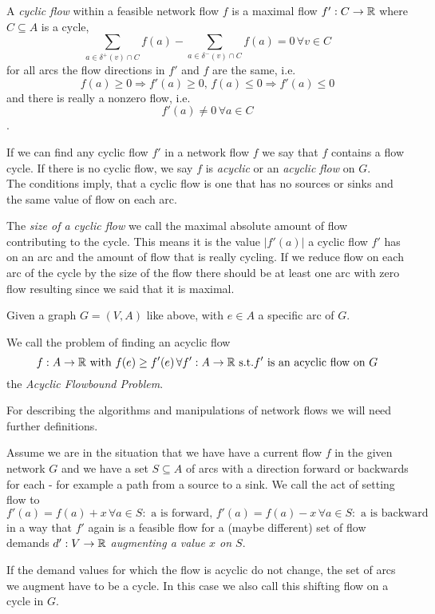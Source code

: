 \begin{definition}
A \textit{cyclic flow} within a feasible network flow $f$ is a maximal flow $f':C\to \mathbb{R}$ where $C\subseteq A$ is a 
cycle, $$\sum_{a\in \delta^+(v)\cap C}f(a)-\sum_{a\in\delta^-(v)\cap C}f(a) = 0 \, \forall v\in C$$ for all arcs the 
flow directions in $f'$ and $f$ are the same, i.e. $$f(a)\ge 0\Rightarrow f'(a)\ge 0,\, f(a)\le 0 \Rightarrow f'(a)\le 
0$$ and there is really a nonzero flow, i.e. $$f'(a) \ne 0 \,\forall a\in C$$. 

If we can find any cyclic flow $f'$ in a network flow $f$ we say that $f$ contains a flow cycle. If there is no cyclic 
flow, we say $f$ is \textit{acyclic} or an \textit{acyclic flow} on $G$.\\

The conditions imply, that a cyclic flow is one that has no sources or sinks and the same value of flow on each arc.

The \textit{size of a cyclic flow} we call the maximal absolute amount of flow contributing to the cycle. This means 
it is the value $|f'(a)|$ a cyclic flow $f'$ has on an arc and the amount of flow that is really cycling. If we reduce 
flow on each arc of the cycle by the size of the flow there should be at least one arc with zero flow resulting since 
we said that it is maximal.
\end{definition}


\begin{definition}
  Given a graph $G=(V,A)$ like above, with $e \in A$ a specific arc of $G$. 
  
  We call the problem of finding an acyclic flow 
  $$f:A\to \mathbb{R}\textrm{ with }f(e)\ge f'(e)\,\forall f':A\to \mathbb{R} \textrm{ s.t.} f' \textrm{ is an acyclic flow on }G$$
  the \textit{ Acyclic Flowbound Problem}.
\end{definition}
For describing the algorithms and manipulations of network flows we will need further definitions. 
\begin{definition}
 Assume we are in the situation that we have have a current flow $f$ in the given network $G$ and we have a set 
$S\subseteq A$ of arcs with a direction forward or backwards for each - for example a path from a source to a sink. We 
call the act of setting flow to
$$f'(a)= f(a)+x \,\forall a\in S:\textrm{ a is forward, }f'(a)= f(a)-x \,\forall a\in S:\textrm{ a is backward}$$
in a way that $f'$ again is a feasible flow for a (maybe different) set of flow demands $d':V\to \mathbb{R}$ 
\textit{ augmenting a value $x$ on $S$}. 

If the demand values for which the flow is acyclic do not change, the set of arcs we augment have to be a 
cycle. In this case we also call this shifting flow on a cycle in $G$.
\end{definition}


